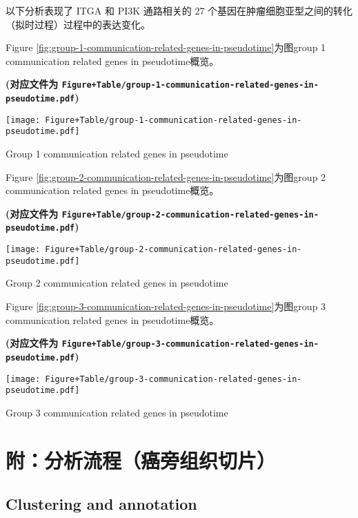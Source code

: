 \documentclass[
]{article}
\begin{document}
以下分析表现了 ITGA 和 PI3K 通路相关的 27 个基因在肿瘤细胞亚型之间的转化（拟时过程）过程中的表达变化。

Figure \ref{fig:group-1-communication-related-genes-in-pseudotime}为图group 1 communication related genes in pseudotime概览。

\textbf{(对应文件为 \texttt{Figure+Table/group-1-communication-related-genes-in-pseudotime.pdf})}

\def\@captype{figure}
\begin{center}
\texttt{[image: Figure+Table/group-1-communication-related-genes-in-pseudotime.pdf]}
\caption{Group 1 communication related genes in pseudotime}\label{fig:group-1-communication-related-genes-in-pseudotime}
\end{center}

Figure \ref{fig:group-2-communication-related-genes-in-pseudotime}为图group 2 communication related genes in pseudotime概览。

\textbf{(对应文件为 \texttt{Figure+Table/group-2-communication-related-genes-in-pseudotime.pdf})}

\def\@captype{figure}
\begin{center}
\texttt{[image: Figure+Table/group-2-communication-related-genes-in-pseudotime.pdf]}
\caption{Group 2 communication related genes in pseudotime}\label{fig:group-2-communication-related-genes-in-pseudotime}
\end{center}

Figure \ref{fig:group-3-communication-related-genes-in-pseudotime}为图group 3 communication related genes in pseudotime概览。

\textbf{(对应文件为 \texttt{Figure+Table/group-3-communication-related-genes-in-pseudotime.pdf})}

\def\@captype{figure}
\begin{center}
\texttt{[image: Figure+Table/group-3-communication-related-genes-in-pseudotime.pdf]}
\caption{Group 3 communication related genes in pseudotime}\label{fig:group-3-communication-related-genes-in-pseudotime}
\end{center}

\hypertarget{workflow2}{%
\section{附：分析流程（癌旁组织切片）}\label{workflow2}}

\hypertarget{clustering-and-annotation}{%
\subsection{Clustering and annotation}\label{clustering-and-annotation}}
\end{document}
